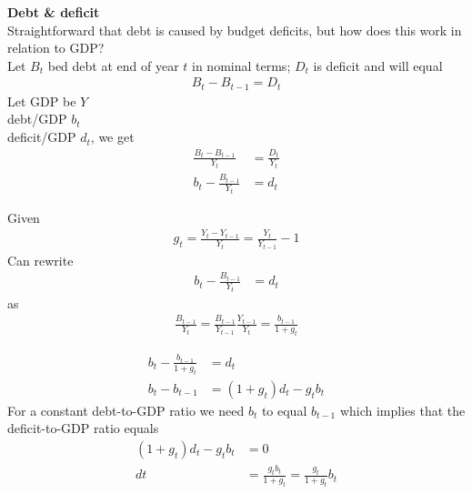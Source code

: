 \documentclass{beamer}
\begin{document}
\begin{frame}
  \textbf{Debt \& deficit}\\
  Straightforward that debt is caused by budget deficits, but how does this work in relation to GDP?\\
  \medskip
  Let $B_t$ bed debt at end of year $t$ in nominal terms; $D_t$ is deficit and will equal
  \begin{align}
    B_t-B_{t-1}=D_t
 \end{align}  
  Let GDP be $Y$\\
  debt/GDP $b_t$\\
  deficit/GDP $d_t$, we get
  \begin{align}
    \frac{B_t-B_{t-1}}{Y_t} &= \frac{D_t}{Y_t}\\ \nonumber
    b_t-\frac{B_{t-1}}{Y_t} &= d_t  
  \end{align}
\end{frame}

\begin{frame}
 Given 
 \begin{align}
   g_t=\frac{Y_t-Y_{t-1}}{Y_t}=\frac{Y_t}{Y_{t-1}}-1
 \end{align}
 Can rewrite
 \begin{align}
   b_t-\frac{B_{t-1}}{Y_t} &= d_t  
 \end{align}
 as 
 \begin{align}
  \frac{B_{t-1}}{Y_t} = \frac{B_{t-1}}{Y_{t-1}}\frac{Y_{t-1}}{Y_t} = \frac{b_{t-1}}{1+g_t} 
 \end{align}
\end{frame}

\begin{frame}
  \begin{align}
    b_t-\frac{b_{t-1}}{1+g_t} &= d_t\\
  b_t-b_{t-1} &= (1+g_t)d_t-g_tb_t  
  \end{align}
  \medskip
  For a constant debt-to-GDP ratio we need $b_t$ to equal $b_{t-1}$ which implies that the deficit-to-GDP ratio equals
\begin{align}
  (1+g_t)d_t-g_tb_t &=0 \\
  dt &= \frac{g_tb_t}{1+g_t} = \frac{g_t}{1+g_t}b_t
\end{align}
\end{frame}
\end{document}
